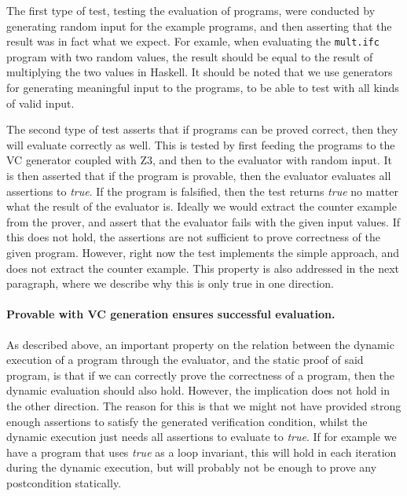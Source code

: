The first type of test, testing the evaluation of programs, were conducted by generating random input for the example programs, and then asserting that the result was in fact what we expect. For examle, when evaluating the \texttt{mult.ifc} program with two random values, the result should be equal to the result of multiplying the two values in Haskell.
It should be noted that we use generators for generating meaningful input to the programs, to be able to test with all kinds of valid input.

The second type of test asserts that if programs can be proved correct, then they will evaluate correctly as well.
This is tested by first feeding the programs to the VC generator coupled with Z3, and then to the evaluator with random input.
It is then asserted that if the program is provable, then the evaluator evaluates all assertions to \textit{true}.
If the program is falsified, then the test returns \textit{true} no matter what the result of the evaluator is.
Ideally we would extract the counter example from the prover, and assert that the evaluator fails with the given input values. If this does not hold, the assertions are not sufficient to prove correctness of the given program. 
However, right now the test implements the simple approach, and does not extract the counter example.
This property is also addressed in the next paragraph, where we describe why this is only true in one direction.

\paragraph{Provable with VC generation ensures successful evaluation.}

As described above, an important property on the relation between the dynamic execution of a program through the evaluator, and the static proof of said program, is that if we can correctly prove the correctness of a program, then the dynamic evaluation should also hold. 
However, the implication does not hold in the other direction. The reason for this is that we might not have provided strong enough assertions to satisfy the generated verification condition, whilst the dynamic execution just needs all assertions to evaluate to \textit{true}.
If for example we have a program that uses \textit{true} as a loop invariant, this will hold in each iteration during the dynamic execution, but will probably not be enough to prove any postcondition statically.

